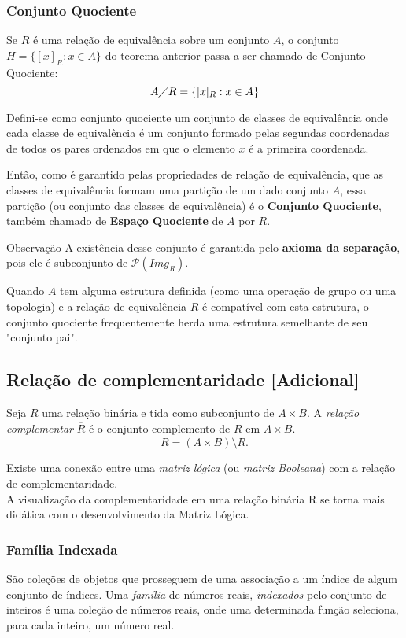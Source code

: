 \subsubsection{Conjunto Quociente}
Se $R$ é uma relação de equivalência sobre um conjunto $A$, o conjunto $H = \{[x]_{R}: x \in A\}$ do teorema anterior passa a ser chamado de Conjunto Quociente:
$$A \diagup R = \{[x]_{R}: x \in A\}$$
\begin{definition}
  Defini-se como conjunto quociente um conjunto de classes de equivalência onde cada classe de equivalência é um conjunto formado pelas segundas coordenadas de todos os pares ordenados em que o elemento $x$ é a primeira coordenada.
\end{definition}
Então, como é garantido pelas propriedades de relação de equivalência, que as classes de equivalência formam uma partição de um dado conjunto $A$, essa partição (ou conjunto das classes de equivalência) é o \textbf{Conjunto Quociente}, também chamado de \textbf{Espaço Quociente} de $A$ por $R$.
\begin{mymdframed}{Observação}
  A existência desse conjunto é garantida pelo \textbf{axioma da separação}, pois ele é subconjunto de $\mathcal{P}(\mathit{Img}_{R})$.
\end{mymdframed}
Quando $A$ tem alguma estrutura definida (como uma operação de grupo ou uma topologia) e a relação de equivalência $R$ é \underline{compatível} com esta estrutura, o conjunto quociente frequentemente herda uma estrutura semelhante de seu "conjunto pai".
\newpage

\subsection{Relação de complementaridade [Adicional]}
\begin{definition}
  Seja $R$ uma relação binária e tida como subconjunto de $A \times B$. A \textit{relação complementar} $\overline{R}$ é o conjunto complemento de $R$ em $A \times B$.
  $$\overline{R} = (A \times B) \setminus R.$$  
\end{definition}
Existe uma conexão entre uma \textit{matriz lógica} (ou \textit{matriz Booleana}) com a relação de complementaridade.\\
A visualização da complementaridade em uma relação binária R se torna mais didática com o desenvolvimento da Matriz Lógica.
\subsubsection{Família Indexada}
São coleções de objetos que prosseguem de uma associação a um índice de algum conjunto de índices. Uma \textit{família} de números reais, \textit{indexados} pelo conjunto de inteiros é uma coleção de números reais, onde uma determinada função seleciona, para cada inteiro, um número real.

